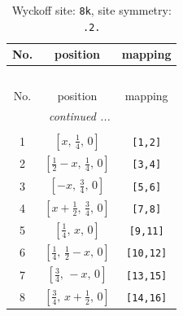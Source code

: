 \documentclass[fleqn,8pt]{jsarticle}
\begin{document}
\begin{longtable}{ccc}
\caption{Wyckoff site: {\tt 8k}, site symmetry: {\tt .2.}}
 \\
 \hline \hline
No. & position & mapping \\ \hline \endfirsthead

\multicolumn{2}{l}{\tablename\ \thetable{}} \\
 \hline \hline
No. & position & mapping \\ \hline \endhead

 \hline \hline
\multicolumn{2}{r}{\footnotesize\it continued ...} \\ \endfoot

 \hline \hline
\multicolumn{2}{r}{} \\ \endlastfoot

1 & $\left[ x,\, \frac{1}{4},\, 0 \right]$ & {\tt [1,2]} \\ \hline
2 & $\left[ \frac{1}{2} - x,\, \frac{1}{4},\, 0 \right]$ & {\tt [3,4]} \\ \hline
3 & $\left[ - x,\, \frac{3}{4},\, 0 \right]$ & {\tt [5,6]} \\ \hline
4 & $\left[ x + \frac{1}{2},\, \frac{3}{4},\, 0 \right]$ & {\tt [7,8]} \\ \hline
5 & $\left[ \frac{1}{4},\, x,\, 0 \right]$ & {\tt [9,11]} \\ \hline
6 & $\left[ \frac{1}{4},\, \frac{1}{2} - x,\, 0 \right]$ & {\tt [10,12]} \\ \hline
7 & $\left[ \frac{3}{4},\, - x,\, 0 \right]$ & {\tt [13,15]} \\ \hline
8 & $\left[ \frac{3}{4},\, x + \frac{1}{2},\, 0 \right]$ & {\tt [14,16]} \\
\end{longtable}
\renewcommand{\arraystretch}{1.2}
\end{document}

